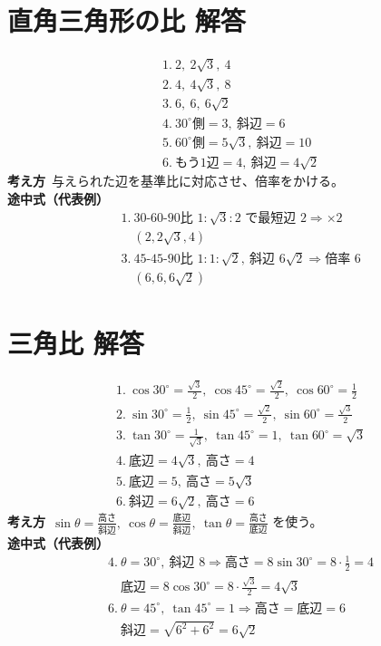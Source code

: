\documentclass[paper=b4j,landscape,twocolumn,fleqn]{jlreq}
\begin{document}
\newpage
\section{直角三角形の比 解答}
\begin{align*}
&1.\ 2,\ 2\sqrt3,\ 4\\[0.45em]
&2.\ 4,\ 4\sqrt3,\ 8\\[0.45em]
&3.\ 6,\ 6,\ 6\sqrt2\\[0.45em]
&4.\ 30^\circ\text{側}=3,\ \text{斜辺}=6\\[0.45em]
&5.\ 60^\circ\text{側}=5\sqrt3,\ \text{斜辺}=10\\[0.45em]
&6.\ \text{もう1辺}=4,\ \text{斜辺}=4\sqrt2
\end{align*}
\textbf{考え方}\
与えられた辺を基準比に対応させ、倍率をかける。\\
\textbf{途中式（代表例）}
\begin{align*}
&1.\ 30\text{-}60\text{-}90\text{比 }1:\sqrt3:2\text{ で最短辺 }2\Rightarrow \times2\\
&\quad (2,2\sqrt3,4)\\
&3.\ 45\text{-}45\text{-}90\text{比 }1:1:\sqrt2,\ \text{斜辺 }6\sqrt2\Rightarrow \text{倍率 }6\\
&\quad (6,6,6\sqrt2)
\end{align*}

\newpage
\section{三角比 解答}
\begin{align*}
&1.\ \cos30^\circ=\frac{\sqrt3}{2},\ \cos45^\circ=\frac{\sqrt2}{2},\ \cos60^\circ=\frac12\\[0.45em]
&2.\ \sin30^\circ=\frac12,\ \sin45^\circ=\frac{\sqrt2}{2},\ \sin60^\circ=\frac{\sqrt3}{2}\\[0.45em]
&3.\ \tan30^\circ=\frac{1}{\sqrt3},\ \tan45^\circ=1,\ \tan60^\circ=\sqrt3\\[0.45em]
&4.\ \text{底辺}=4\sqrt3,\ \text{高さ}=4\\[0.45em]
&5.\ \text{底辺}=5,\ \text{高さ}=5\sqrt3\\[0.45em]
&6.\ \text{斜辺}=6\sqrt2,\ \text{高さ}=6
\end{align*}
\textbf{考え方}\
$\sin\theta=\frac{\text{高さ}}{\text{斜辺}},\ \cos\theta=\frac{\text{底辺}}{\text{斜辺}},\ \tan\theta=\frac{\text{高さ}}{\text{底辺}}$ を使う。\\
\textbf{途中式（代表例）}
\begin{align*}
&4.\ \theta=30^\circ,\ \text{斜辺 }8\Rightarrow \text{高さ}=8\sin30^\circ=8\cdot\frac12=4\\
&\quad \text{底辺}=8\cos30^\circ=8\cdot\frac{\sqrt3}{2}=4\sqrt3\\
&6.\ \theta=45^\circ,\ \tan45^\circ=1\Rightarrow \text{高さ}=\text{底辺}=6\\
&\quad \text{斜辺}=\sqrt{6^2+6^2}=6\sqrt2
\end{align*}
\end{document}
